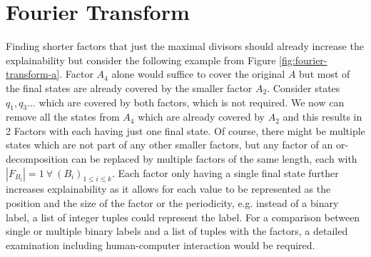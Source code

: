 \section{Fourier Transform}
\label{ch:novel-algos:fourier}
Finding shorter factors that just the maximal divisors should already increase the explainability but consider the following example from Figure \ref{fig:fourier-transform-a}.
Factor $A_4$ alone would suffice to cover the original \DFA $A$ but most of the final states are already covered by the smaller factor $A_2$.
Consider states $q_1, q_3 \dots$ which are covered by both factors, which is not required.
We now can remove all the states from $A_4$ which are already covered by $A_2$ and this results in 2 Factors with each having just one final state.
Of course, there might be multiple states which are not part of any other smaller factors, but any factor of an or-decomposition can be replaced by multiple factors of the same length, each with $|F_{B_i}| = 1 ~\forall~ (B_i)_{1 \leq i \leq k}$.
Each factor only having a single final state further increases explainability as it allows for each value to be represented as the position and the size of the factor or the periodicity, e.g. instead of a binary label, a list of integer tuples could represent the label.
For a comparison between single or multiple binary labels and a list of tuples with the factors, a detailed examination including human-computer interaction would be required.

